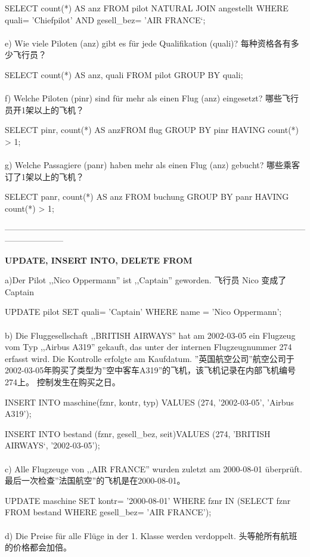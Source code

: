 \documentclass[fleqn]{article}
\begin{document}
SELECT count(*) AS anz FROM pilot NATURAL JOIN angestellt WHERE quali= 'Chiefpilot' AND gesell\_bez= 'AIR FRANCE‘;
\\
\\
e) Wie viele Piloten (anz) gibt es für jede Qualifikation (quali)? 每种资格各有多少飞行员？

SELECT count(*) AS anz, quali FROM pilot GROUP BY quali;
\\
\\
f) Welche Piloten (pinr) sind für mehr als einen Flug (anz) eingesetzt? 哪些飞行员开1架以上的飞机？

SELECT pinr, count(*) AS anzFROM flug GROUP BY pinr HAVING count(*) > 1;
\\
\\
g) Welche Passagiere (panr) haben mehr als einen Flug (anz) gebucht? 哪些乘客订了1架以上的飞机？

SELECT panr, count(*) AS anz FROM buchung GROUP BY panr HAVING count(*) > 1;

\noindent---------------------------------------------------------------------------------------------------------------------------------

\noindent\textbf{UPDATE, INSERT INTO, DELETE FROM}

\noindent a)Der Pilot ,,Nico Oppermann'' ist ,,Captain'' geworden. 飞行员 Nico 变成了Captain

UPDATE pilot SET quali= 'Captain' WHERE name = 'Nico Oppermann';
\\
\\
b) Die Fluggesellschaft ,,BRITISH AIRWAYS'' hat am 2002-03-05 ein Flugzeug vom Typ ,,Airbus A319'' gekauft, das unter der internen Flugzeugnummer 274 erfasst wird. Die Kontrolle erfolgte am Kaufdatum.
''英国航空公司”航空公司于2002-03-05年购买了类型为''空中客车A319”的飞机，该飞机记录在内部飞机编号274上。 控制发生在购买之日。

INSERT INTO maschine(fznr, kontr, typ) VALUES (274, '2002-03-05', 'Airbus A319');

INSERT INTO bestand (fznr, gesell\_bez, seit)VALUES (274, 'BRITISH AIRWAYS‘, '2002-03-05');
\\
\\
c) Alle Flugzeuge von ,,AIR FRANCE'' wurden zuletzt am 2000-08-01 überprüft. 最后一次检查''法国航空”的飞机是在2000-08-01。

UPDATE maschine SET kontr= '2000-08-01' WHERE fznr IN (SELECT fznr FROM bestand 
WHERE gesell\_bez= 'AIR FRANCE');
\\
\\
d) Die Preise für alle Flüge in der 1. Klasse werden verdoppelt. 头等舱所有航班的价格都会加倍。
\end{document}
